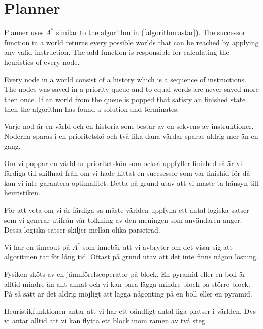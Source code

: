 \section{Planner}
Planner uses $A^*$ similar to the algorithm in (\ref{algorithm:astar}). The
successor function in a world returns every possible worlds that can be reached
by applying any valid instruction. The add function is responsible for
calculating the heuristics of every node.

Every node in a world consist of a history which is a sequence of instructions. 
The nodes was saved in a priority queue and to equal words are never saved more
then once. If an world from the queue is popped that satisfy an finished state
then the algorithm has found a solution and terminates.   

Varje nod är en värld och en historia som består av en sekvens av
instruktioner.  Noderna sparas i en prioritetskö och två lika dana värdar
sparas aldrig mer än en gång. 

Om vi poppar en värld ur prioritetskön som också
uppfyller finished så är vi färdiga till skillnad från om vi hade hittat en
succsessor som var finishid för då kan vi inte garantera optimalitet. Detta på
grund utav att vi måste ta hänsyn till heuristiken. 

För att veta om vi är färdiga så måste världen uppfylla ett antal logiska
satser som vi generar utifrån vår tolkning av den meningen som användaren
anger. Dessa logiska satser skiljer mellan olika parseträd.

Vi har en timeout på $A^*$ som innebär att vi avbryter om det visar sig att
algoritmen tar för lång tid. Oftast på grund utav att det inte finns någon
lösning. 

Fysiken sköts av en jämnförelseoperator på block. En pyramid eller en boll är alltid
mindre än allt annat och vi kan bara lägga mindre block på större block. På så
sätt är det aldrig möjligt att lägga någonting på en boll eller en pyramid.  


Heuristikfunktionen antar att vi har ett oändligt antal liga platser i världen.
Dvs vi antar alltid att vi kan flytta ett block inom ramen av två steg. 








